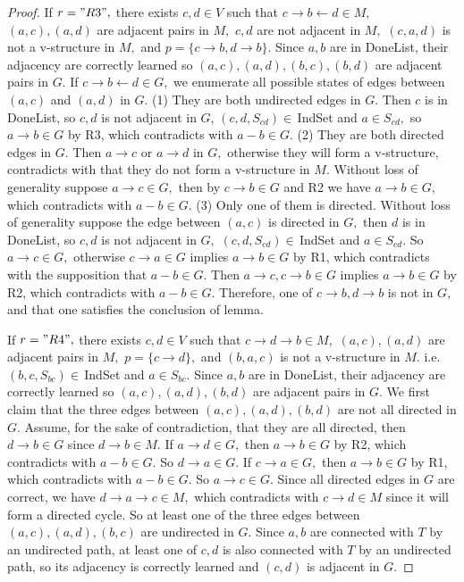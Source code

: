 \documentclass{article}
\begin{document}
\begin{proof}
If $r="R3",$ there exists $c,d\in V$ such that $c\to b\leftarrow d\in M,$ $(a,c),(a,d)$ are adjacent pairs in $M,$ $c,d$ are not adjacent in $M,$ $(c,a,d)$ is not a v-structure in $M,$ and $p=\{c\to b, d\to b\}.$ Since $a,b$ are in DoneList, their adjacency are correctly learned so $(a,c),(a,d),(b,c),(b,d)$ are adjacent pairs in $G.$ If $c\to b\leftarrow d\in G,$ we enumerate all possible states of edges between $(a,c)$ and $(a,d)$ in $G.$ (1) They are both undirected edges in $G.$ Then $c$ is in DoneList, so $c,d$ is not adjacent in $G$, $(c,d,S_{cd})\in\,$IndSet and $a\in S_{cd},$ so $a\to b\in G$ by R3, which contradicts with $a-b\in G.$ (2) They are both directed edges in $G.$ Then $a\to c$ or $a\to d$ in $G,$ otherwise they will form a v-structure, contradicts with that they do not form a v-structure in $M.$ Without loss of generality suppose $a\to c\in G,$ then by $c\to b\in G$ and R2 we have $a\to b\in G,$ which contradicts with $a-b\in G.$ (3) Only one of them is directed. Without loss of generality suppose the edge between $(a,c)$ is directed in $G,$ then $d$ is in DoneList, so $c,d$ is not adjacent in $G,$ $(c,d,S_{cd})\in\,$IndSet and $a\in S_{cd}.$ So $a\to c\in G,$ otherwise $c\to a\in G$ implies $a\to b\in G$ by R1, which contradicts with the supposition that $a-b\in G.$ Then $a\to c,c\to b\in G$ implies $a\to b\in G$ by R2, which contradicts with $a-b\in G.$ Therefore, one of $c\to b,d\to b$ is not in $G,$ and that one satisfies the conclusion of lemma.

If $r="R4",$ there exists $c,d\in V$ such that $c\to d\to b\in M,$ $(a,c),(a,d)$ are adjacent pairs in $M,$ $p=\{c\to d\},$ and $(b,a,c)$ is not a v-structure in $M.$ i.e. $(b,c,S_{bc})\in\,$IndSet and $a\in S_{bc}.$ Since $a,b$ are in DoneList, their adjacency are correctly learned so $(a,c),(a,d),(b,d)$ are adjacent pairs in $G.$ We first claim that the three edges between $(a,c),(a,d),(b,d)$ are not all directed in $G.$ Assume, for the sake of contradiction, that they are all directed, then $d\to b\in G$ since $d\to b\in M.$ If $a\to d\in G,$ then $a\to b\in G$ by R2, which contradicts with $a-b\in G.$ So $d\to a\in G.$ If $c\to a\in G,$ then $a\to b\in G$ by R1, which contradicts with $a-b\in G.$ So $a\to c\in G.$ Since all directed edges in $G$ are correct, we have $d\to a\to c\in M,$ which contradicts with $c\to d\in M$ since it will form a directed cycle. So at least one of the three edges between $(a,c),(a,d),(b,c)$ are undirected in $G.$ Since $a,b$ are connected with $T$ by an undirected path, at least one of $c,d$ is also connected with $T$ by an undirected path, so its adjacency is correctly learned and $(c,d)$ is adjacent in $G.$


\end{proof}
\end{document}
